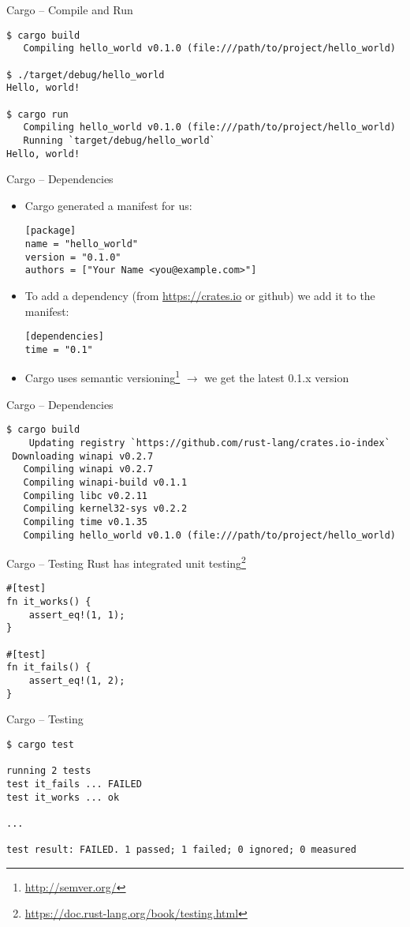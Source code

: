 \begin{frame}[fragile]{Cargo -- Compile and Run}
\begin{verbatim}
$ cargo build
   Compiling hello_world v0.1.0 (file:///path/to/project/hello_world)

$ ./target/debug/hello_world
Hello, world!

$ cargo run
   Compiling hello_world v0.1.0 (file:///path/to/project/hello_world)
   Running `target/debug/hello_world`
Hello, world!
\end{verbatim}
\end{frame}

\begin{frame}[fragile]{Cargo -- Dependencies}
\begin{itemize}
    \item Cargo generated a manifest for us:
\begin{verbatim}
[package]
name = "hello_world"
version = "0.1.0"
authors = ["Your Name <you@example.com>"]
\end{verbatim}
    \item To add a dependency (from \url{https://crates.io} or github) we add it to the manifest:
\begin{verbatim}
[dependencies]
time = "0.1"
\end{verbatim}
    \item Cargo uses semantic versioning\footnote{\url{http://semver.org/}}
    $\rightarrow$ we get the latest 0.1.x version
\end{itemize}
\end{frame}

\begin{frame}[fragile]{Cargo -- Dependencies}
\begin{verbatim}
$ cargo build
    Updating registry `https://github.com/rust-lang/crates.io-index`
 Downloading winapi v0.2.7
   Compiling winapi v0.2.7
   Compiling winapi-build v0.1.1
   Compiling libc v0.2.11
   Compiling kernel32-sys v0.2.2
   Compiling time v0.1.35
   Compiling hello_world v0.1.0 (file:///path/to/project/hello_world)
\end{verbatim}
\end{frame}

\begin{frame}[fragile,c]{Cargo -- Testing}
	Rust has integrated unit testing\footnote{\url{https://doc.rust-lang.org/book/testing.html}}

\begin{verbatim}
#[test]
fn it_works() {
    assert_eq!(1, 1);
}

#[test]
fn it_fails() {
    assert_eq!(1, 2);
}
\end{verbatim}
\end{frame}

\begin{frame}[fragile,c]{Cargo -- Testing}
\begin{verbatim}
$ cargo test

running 2 tests
test it_fails ... FAILED
test it_works ... ok

...

test result: FAILED. 1 passed; 1 failed; 0 ignored; 0 measured
\end{verbatim}
\end{frame}
